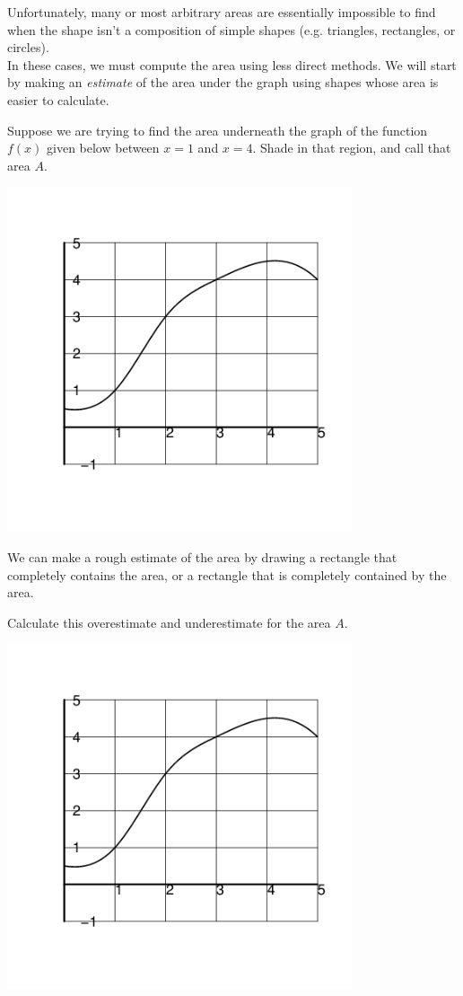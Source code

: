 Unfortunately, many or most arbitrary areas are essentially impossible
to find when the shape isn't a composition of simple shapes (e.g. triangles, rectangles, or circles). \\[1ex]

In these cases, we must compute the area using less direct methods.
We will start by making an {\em estimate} of the area under the graph
using shapes whose area is easier to calculate.

\newpage

\problem Suppose we are trying to find the area underneath the graph of the
function $f(x)$ given below between $x = 1$ and $x=4$.  Shade in that
region, and call that area $A$.

\begin{center}
\includegraphics[width=4in]{graphics/notes_04_graph06}
\end{center}


\newpage
We can make a rough estimate of the area by drawing a rectangle that
completely contains the area, or a rectangle that is completely
contained by the area.


\problem 
{Calculate this overestimate and underestimate for the
  area $A$.}
  
\hfill \includegraphics[width=4in]{graphics/notes_04_graph06}


